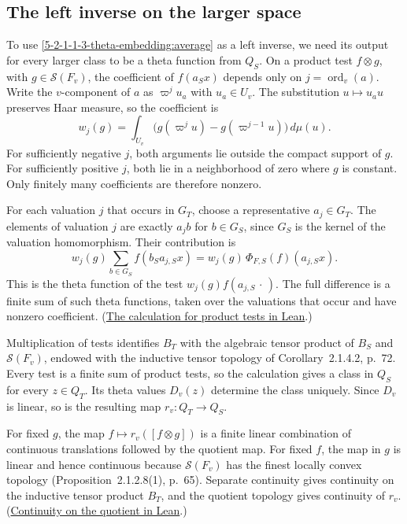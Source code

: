 \subsection{The left inverse on the larger space}

To use \eqref{5-2-1-1-3-theta-embedding:average} as a left inverse, we need
its output for every larger class to be a theta function from \(Q_S\). On a
product test \(f\otimes g\), with \(g\in\mathcal S(F_v)\), the coefficient of
\(f(a_S x)\) depends only on \(j=\operatorname{ord}_v(a)\). Write the
\(v\)-component of \(a\) as \(\varpi^j u_a\) with \(u_a\in U_v\).
The substitution \(u\mapsto u_a u\) preserves Haar measure, so the
coefficient is
\[
  w_j(g)=\int_{U_v}
    \bigl(g(\varpi^j u)-g(\varpi^{j-1}u)\bigr)\,d\mu(u).
\]
For sufficiently negative \(j\), both arguments lie outside the compact
support of \(g\). For sufficiently positive \(j\), both lie in a
neighborhood of zero where \(g\) is constant. Only finitely many
coefficients are therefore nonzero.

For each valuation \(j\) that occurs in \(G_T\), choose a representative
\(a_j\in G_T\). The elements of valuation \(j\) are exactly \(a_j b\) for
\(b\in G_S\), since \(G_S\) is the kernel of the valuation homomorphism.
Their contribution is
\[
  w_j(g)\sum_{b\in G_S}f(b_S a_{j,S}x)
      = w_j(g)\,\Phi_{F,S}(f)(a_{j,S}x).
\]
This is the theta function of the test \(w_j(g) f(a_{j,S}\,\cdot\,)\).
The full difference is a finite sum of such theta functions, taken over the
valuations that occur and have nonzero coefficient.
(\href{https://github.com/mccorvie/riemann-masullo/blob/ac7e1cde68ff1fac01ecbef3c0e9f48e46bc1f06/RiemannMasullo/Ch05_ThetaZSpaces/Sec2.lean#L3827-L3846}{The calculation for product tests in Lean}.)

Multiplication of tests identifies \(B_T\) with the algebraic tensor product
of \(B_S\) and \(\mathcal S(F_v)\), endowed with the inductive tensor topology
of Corollary~2.1.4.2, p.~72. Every test is a finite sum of product tests, so
the calculation gives a class in \(Q_S\) for every \(z\in Q_T\). Its theta
values \(D_v(z)\) determine the class uniquely. Since \(D_v\) is linear, so
is the resulting map \(r_v\colon Q_T\to Q_S\).

For fixed \(g\), the map \(f\mapsto r_v([f\otimes g])\) is a finite linear
combination of continuous translations followed by the quotient map. For
fixed \(f\), the map in \(g\) is linear and hence continuous because
\(\mathcal S(F_v)\) has the finest locally convex topology
(Proposition~2.1.2.8(1), p.~65). Separate continuity gives continuity on the
inductive tensor product \(B_T\), and the quotient topology gives continuity
of \(r_v\).
(\href{https://github.com/mccorvie/riemann-masullo/blob/ac7e1cde68ff1fac01ecbef3c0e9f48e46bc1f06/RiemannMasullo/Ch05_ThetaZSpaces/Sec2.lean#L3198-L3228}{Continuity on the quotient in Lean}.)

